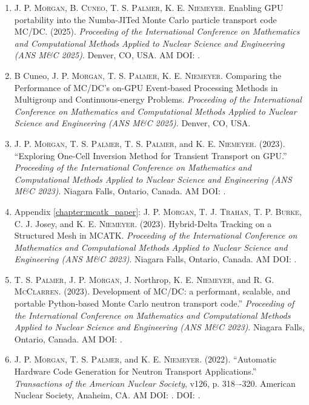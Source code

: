\begin{enumerate}
    \item \textsc{J. P. Morgan}, \textsc{B. Cuneo}, \textsc{T. S. Palmer}, \textsc{K. E. Niemeyer}. Enabling GPU portability into the Numba-JITed Monte Carlo particle transport code MC/DC. (2025). \emph{Proceeding of the International Conference on Mathematics and Computational Methods Applied to Nuclear Science and Engineering (ANS M\&C 2025)}. Denver, CO, USA. AM DOI: .

    \item B Cuneo, \textsc{J. P. Morgan}, \textsc{T. S. Palmer}, \textsc{K. E. Niemeyer}. Comparing the Performance of MC/DC’s on-GPU Event-based Processing Methods in Multigroup and Continuous-energy Problems. \emph{Proceeding of the International Conference on Mathematics and Computational Methods Applied to Nuclear Science and Engineering (ANS M\&C 2025)}. Denver, CO, USA.

    \item \textsc{J. P. Morgan}, \textsc{T. S. Palmer}, \textsc{T. S. Palmer}, and \textsc{K. E. Niemeyer}. (2023). “Exploring One-Cell Inversion Method for Transient Transport on GPU.” \emph{Proceeding of the International Conference on Mathematics and Computational Methods Applied to Nuclear Science and Engineering (ANS M\&C 2023)}. Niagara Falls, Ontario, Canada. AM DOI: .

    \item Appendix \ref{chapter:mcatk_paper}: \textsc{J. P. Morgan}, \textsc{T. J. Trahan}, \textsc{T. P. Burke}, {C. J. Josey}, and \textsc{K. E. Niemeyer}. (2023). Hybrid-Delta Tracking on a Structured Mesh in MCATK. \emph{Proceeding of the International Conference on Mathematics and Computational Methods Applied to Nuclear Science and Engineering (ANS M\&C 2023)}. Niagara Falls, Ontario, Canada. AM DOI: .

    \item \textsc{T. S. Palmer}, \textsc{J. P. Morgan}, {J. Northrop}, \textsc{K. E. Niemeyer}, and \textsc{R. G. McClarren}. (2023). Development of MC/DC: a performant, scalable, and portable Python-based Monte Carlo neutron transport code.” \emph{Proceeding of the International Conference on Mathematics and Computational Methods Applied to Nuclear Science and Engineering (ANS M\&C 2023)}. Niagara Falls, Ontario, Canada. AM DOI: .

    \item \textsc{J. P. Morgan}, \textsc{T. S. Palmer}, and \textsc{K. E. Niemeyer}. (2022). “Automatic Hardware Code Generation for Neutron Transport Applications.” \emph{Transactions of the American Nuclear Society}, v126, p. 318–-320. American Nuclear Society, Anaheim, CA. AM DOI: . DOI: .


\end{enumerate}
